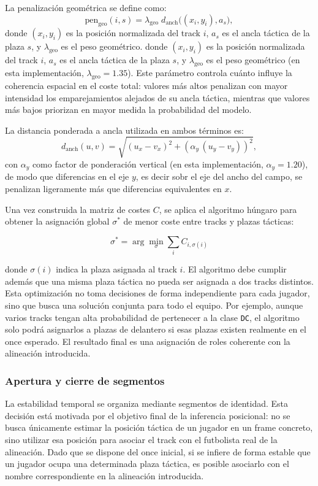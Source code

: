 La penalización geométrica se define como:
\[
\mathrm{pen}_{\mathrm{geo}}(i,s)=\lambda_{\mathrm{geo}}\; d_{\mathrm{anch}}\big((x_i,y_i),a_s\big),
\]
donde \((x_i,y_i)\) es la posición normalizada del track \(i\), \(a_s\) es el ancla táctica de la plaza \(s\), y \(\lambda_{\mathrm{geo}}\) es el peso geométrico.
donde \((x_i,y_i)\) es la posición normalizada del track \(i\), \(a_s\) es el ancla táctica de la plaza \(s\), y \(\lambda_{\mathrm{geo}}\) es el peso geométrico (en esta implementación, \(\lambda_{\mathrm{geo}}=1.35\)). Este parámetro controla cuánto influye la coherencia espacial en el coste total: valores más altos penalizan con mayor intensidad los emparejamientos alejados de su ancla táctica, mientras que valores más bajos priorizan en mayor medida la probabilidad del modelo.

La distancia ponderada a ancla utilizada en ambos términos es:
\[
d_{\mathrm{anch}}(u,v)=\sqrt{(u_x-v_x)^2+\left(\alpha_y\,(u_y-v_y)\right)^2},
\]
con \(\alpha_y\) como factor de ponderación vertical (en esta implementación, \(\alpha_y=1.20\)), de modo que diferencias en el eje \(y\), es decir sobr el eje del ancho del campo, se penalizan ligeramente más que diferencias equivalentes en \(x\).

Una vez construida la matriz de costes \(C\), se aplica el algoritmo húngaro para obtener la asignación global $\sigma^*$ de menor coste entre tracks y plazas tácticas:

\[
\sigma^* =
\arg\min_{\sigma}
\sum_i C_{i,\sigma(i)}
\]

donde \(\sigma(i)\) indica la plaza asignada al track \(i\). El algoritmo debe cumplir además que una misma plaza táctica no pueda ser asignada a dos tracks distintos. Esta optimización no toma decisiones de forma independiente para cada jugador, sino que busca una solución conjunta para todo el equipo. Por ejemplo, aunque varios tracks tengan alta probabilidad de pertenecer a la clase \texttt{DC}, el algoritmo solo podrá asignarlos a plazas de delantero si esas plazas existen realmente en el once esperado. El resultado final es una asignación de roles coherente con la alineación introducida.


\subsubsection{Apertura y cierre de segmentos}
\label{subsec:aperturaSegmentos}

La estabilidad temporal se organiza mediante segmentos de identidad. Esta decisión está motivada por el objetivo final de la inferencia posicional: no se busca únicamente estimar la posición táctica de un jugador en un frame concreto, sino utilizar esa posición para asociar el track con el futbolista real de la alineación. Dado que se dispone del once inicial, si se infiere de forma estable que un jugador ocupa una determinada plaza táctica, es posible asociarlo con el nombre correspondiente en la alineación introducida.

